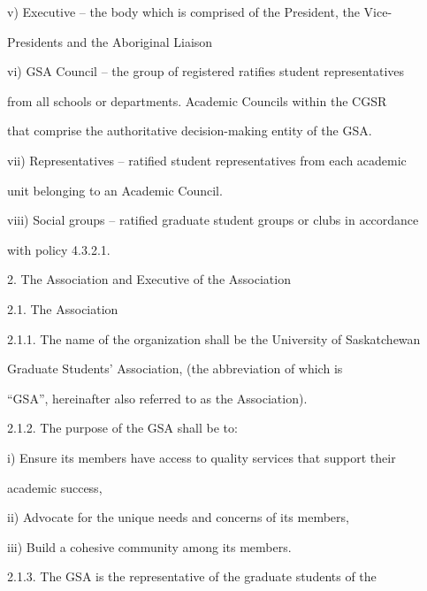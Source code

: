 v)      Executive  –  the body which is comprised of the President, the Vice- 

        Presidents and the Aboriginal Liaison  



vi)      GSA Council – the group of registered ratifies student representatives  

         from all schools or departments. Academic Councils within the CGSR  

        that comprise the authoritative decision-making entity of the GSA.  



vii)    Representatives –  ratified student representatives from each academic  

        unit belonging to an Academic Council.  



viii)    Social groups – ratified graduate student groups or clubs in accordance  

        with policy 4.3.2.1.  



  



2.  The Association and Executive of the Association  



2.1.         The Association  



2.1.1. The name  of the organization  shall be the University  of Saskatchewan  

         Graduate  Students’    Association,    (the    abbreviation    of    which    is   

         “GSA”,   hereinafter   also referred to as the  Association).  



2.1.2. The purpose  of the GSA  shall be to:  



i)      Ensure its members have access to quality services that support their  

         academic success,  



ii)     Advocate for the unique needs and concerns of its members,  



iii)    Build a cohesive community among its members.  



2.1.3. The   GSA   is   the   representative   of   the   graduate   students   of   the  

